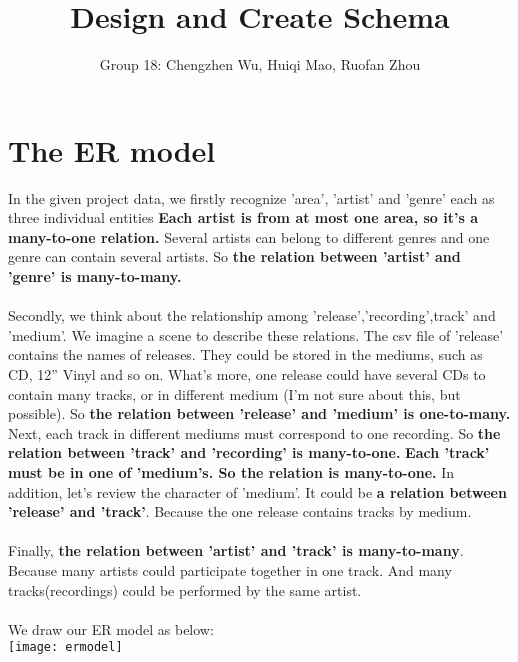 \documentclass[11pt]{article} %
\title{Design and Create Schema}
\author{Group 18: Chengzhen Wu, Huiqi Mao, Ruofan Zhou}
\begin{document}
\maketitle

\section{The ER model}
In the given project data, we firstly recognize 'area', 'artist' and 'genre' each as three individual entities \textbf{Each artist is from at most one area, so it's a many-to-one relation.} Several artists can belong to different genres and one genre can contain several artists. So \textbf{the relation between 'artist' and 'genre' is many-to-many. }\\ \\
Secondly, we  think about the relationship among 'release','recording',track' and 'medium'. We imagine a scene to describe these relations. The csv file of 'release' contains the names of releases. They could be stored in the mediums, such as CD, 12'' Vinyl and so on. What's more, one release could have several CDs to contain many tracks, or in different medium (I'm not sure about this, but possible).  So \textbf{the relation between 'release' and 'medium' is one-to-many.} Next, each track in different mediums must correspond to one recording. So \textbf{the relation between 'track' and 'recording' is many-to-one.}  \textbf{Each 'track' must be in one of  'medium's. So the relation is many-to-one.} In addition, let's review the character of 'medium'. It could be \textbf{a relation between 'release' and 'track'}. Because the one release contains tracks by medium. \\ \\
Finally, \textbf{the relation between 'artist' and 'track' is many-to-many}. Because many artists could participate together in one track. And many tracks(recordings) could be performed by the same artist.\\ \\
We draw our ER model as below:\\
\texttt{[image: ermodel]}
\\
\end{document}

